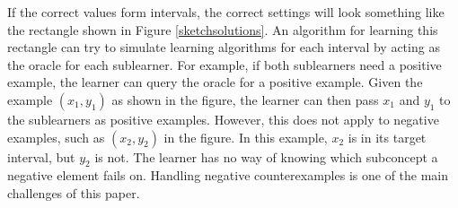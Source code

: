 

If the correct values form intervals, the correct settings will look something like the rectangle shown in Figure \ref{sketchsolutions}.
An algorithm for learning this rectangle can try to simulate learning algorithms for each interval by acting as the oracle for each sublearner. 
For example, if both sublearners need a positive example, the learner can query the oracle for a positive example. 
Given the example $(x_1,y_1)$ as shown in the figure, the learner can then pass $x_1$ and $y_1$ to the sublearners as positive examples. 
However, this does not apply to negative examples, such as $(x_2, y_2)$ in the figure. 
In this example, $x_2$ is in its target interval, but $y_2$ is not. 
The learner has no way of knowing which subconcept a negative element fails on.
Handling negative counterexamples is one of the main challenges of this paper.




